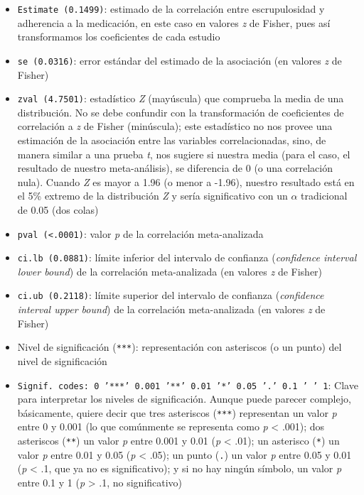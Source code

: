 \documentclass[
  bookmarksnumbered]{article}
\begin{document}
\begin{itemize}
\item
  \texttt{Estimate\ (0.1499)}: estimado de la correlación entre escrupulosidad y adherencia a la medicación, en este caso en valores \emph{z} de Fisher, pues así transformamos los coeficientes de cada estudio
\item
  \texttt{se\ (0.0316)}: error estándar del estimado de la asociación (en valores \emph{z} de Fisher)
\item
  \texttt{zval\ (4.7501)}: estadístico \emph{Z} (mayúscula) que comprueba la media de una distribución. No se debe confundir con la transformación de coeficientes de correlación a \emph{z} de Fisher (minúscula); este estadístico no nos provee una estimación de la asociación entre las variables correlacionadas, sino, de manera similar a una prueba \emph{t}, nos sugiere si nuestra media (para el caso, el resultado de nuestro meta-análisis), se diferencia de 0 (o una correlación nula). Cuando \emph{Z} es mayor a 1.96 (o menor a -1.96), nuestro resultado está en el 5\% extremo de la distribución \emph{Z} y sería significativo con un \(\alpha\) tradicional de 0.05 (dos colas)
\item
  \texttt{pval\ (\textless{}.0001)}: valor \emph{p} de la correlación meta-analizada
\item
  \texttt{ci.lb\ (0.0881)}: límite inferior del intervalo de confianza (\emph{confidence interval lower bound}) de la correlación meta-analizada (en valores \emph{z} de Fisher)
\item
  \texttt{ci.ub\ (0.2118)}: límite superior del intervalo de confianza (\emph{confidence interval upper bound}) de la correlación meta-analizada (en valores \emph{z} de Fisher)
\item
  Nivel de significación (\texttt{***}): representación con asteriscos (o un punto) del nivel de significación
\item
  \texttt{Signif.\ codes:\ 0\ ’***’\ 0.001\ ’**’\ 0.01\ ’*’\ 0.05\ ’.’\ 0.1\ ’\ ’\ 1}: Clave para interpretar los niveles de significación. Aunque puede parecer complejo, básicamente, quiere decir que tres asteriscos (\texttt{***}) representan un valor \emph{p} entre 0 y 0.001 (lo que comúnmente se representa como \emph{p} \textless{} .001); dos asteriscos (\texttt{**}) un valor \emph{p} entre 0.001 y 0.01 (\emph{p} \textless{} .01); un asterisco (\texttt{*}) un valor \emph{p} entre 0.01 y 0.05 (\emph{p} \textless{} .05); un punto (\texttt{.}) un valor \emph{p} entre 0.05 y 0.01 (\emph{p} \textless{} .1, que ya no es significativo); y si no hay ningún símbolo, un valor \emph{p} entre 0.1 y 1 (\emph{p} \textgreater{} .1, no significativo)
\end{itemize}
\end{document}
